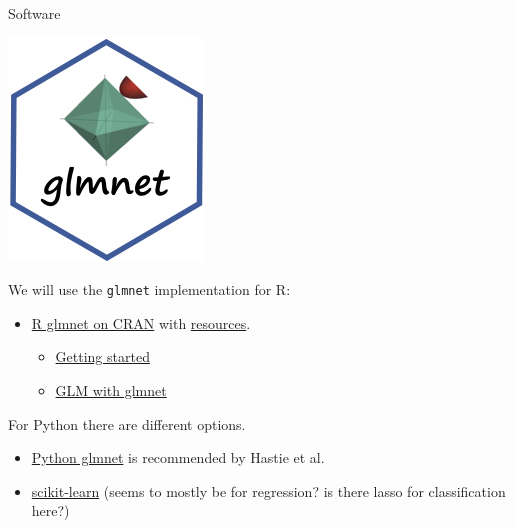 \documentclass[
  ignorenonframetext,
]{beamer}
\providecommand{\tightlist}{%
  \setlength{\itemsep}{0pt}\setlength{\parskip}{0pt}}
\begin{document}
\begin{frame}[fragile]{Software}
\protect\hypertarget{software}{}

\includegraphics{logo.png}

We will use the \texttt{glmnet} implementation for R:

\begin{itemize}
\tightlist
\item
  \href{https://cran.r-project.org/web/packages/glmnet/index.html}{R
  glmnet on CRAN} with
  \href{http://www.stanford.edu/~hastie/glmnet}{resources}.

  \begin{itemize}
  \tightlist
  \item
    \href{https://glmnet.stanford.edu/articles/glmnet.html}{Getting
    started}
  \item
    \href{https://glmnet.stanford.edu/articles/glmnetFamily.html}{GLM
    with glmnet}
  \end{itemize}
\end{itemize}

For Python there are different options.

\begin{itemize}
\tightlist
\item
  \href{https://web.stanford.edu/~hastie/glmnet_python/}{Python glmnet}
  is recommended by Hastie et al.
\item
  \href{https://scikit-learn.org/stable/modules/linear_model.html\#ridge-regression-and-classification}{scikit-learn}
  (seems to mostly be for regression? is there lasso for classification
  here?)
\end{itemize}

\end{frame}
\end{document}
